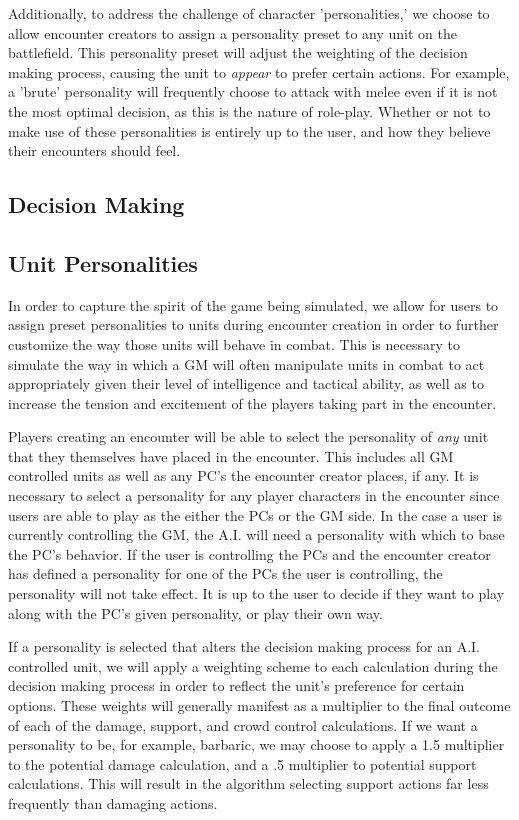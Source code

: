 \documentclass[12pt,a4paper]{report}
\begin{document}
		Additionally, to address the challenge of character 'personalities,' we choose to allow encounter creators to assign a personality preset to any unit on the battlefield. This personality preset will adjust the weighting of the decision making process, causing the unit to \textit{appear} to prefer certain actions. For example, a 'brute' personality will frequently choose to attack with melee even if it is not the most optimal decision, as this is the nature of role-play. Whether or not to make use of these personalities is entirely up to the user, and how they believe their encounters should feel. 
		
		\subsection{Decision Making}
		
		\subsection{Unit Personalities}
		In order to capture the spirit of the game being simulated, we allow for users to assign preset personalities to units during encounter creation in order to further customize the way those units will behave in combat. This is necessary to simulate the way in which a GM will often manipulate units in combat to act appropriately given their level of intelligence and tactical ability, as well as to increase the tension and excitement of the players taking part in the encounter. 
		
		Players creating an encounter will be able to select the personality of \textit{any} unit that they themselves have placed in the encounter. This includes all GM controlled units as well as any PC's the encounter creator places, if any. It is necessary to select a personality for any player characters in the encounter since users are able to play as the either the PCs or the GM side. In the case a user is currently controlling the GM, the A.I. will need a personality with which to base the PC's behavior. If the user is controlling the PCs and the encounter creator has defined a personality for one of the PCs the user is controlling, the personality will not take effect. It is up to the user to decide if they want to play along with the PC's given personality, or play their own way. 
		
		If a personality is selected that alters the decision making process for an A.I. controlled unit, we will apply a weighting scheme to each calculation during the decision making process in order to reflect the unit's preference for certain options. These weights will generally manifest as a multiplier to the final outcome of each of the damage, support, and crowd control calculations. If we want a personality to be, for example, barbaric, we may choose to apply a 1.5 multiplier to the potential damage calculation, and a .5 multiplier to potential support calculations. This will result in the algorithm selecting support actions far less frequently than damaging actions. 
		
\end{document}

